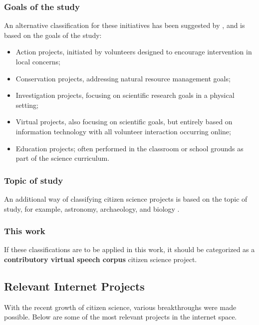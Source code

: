 \subsubsection{Goals of the study}

An alternative classification for these initiatives has been suggested by \cite{wiggins2011conservation}, and is based on the goals of the study:

\begin{itemize}
    \item Action projects, initiated by volunteers designed to encourage intervention in local concerns;
    \item Conservation projects, addressing natural resource management goals;
    \item Investigation projects, focusing on scientific research goals in a physical setting;
    \item Virtual projects, also focusing on scientific goals, but entirely based on information technology with all volunteer interaction occurring online;
    \item Education projects; often performed in the classroom or school grounds as part of the science curriculum.
\end{itemize}

\subsubsection{Topic of study}

An additional way of classifying citizen science projects is based on the topic of study, for example, astronomy, archaeology, and biology \cite{wiggins2011conservation}. 

\subsubsection{This work}

If these classifications are to be applied in this work, it should be categorized as a \textbf{contributory virtual speech corpus} citizen science project.

\subsection{Relevant Internet Projects}

With the recent growth of citizen science, various breakthroughs were made possible. Below are some of the most relevant projects in the internet space.

